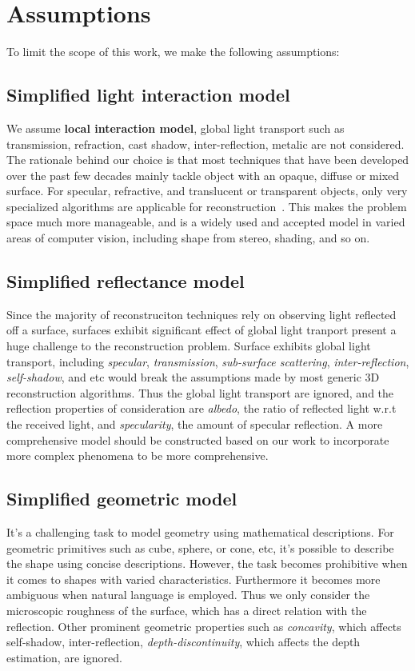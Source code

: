 \section{Assumptions}
To limit the scope of this work, we make the following assumptions:

\subsection{Simplified light interaction model}
We assume \textbf{local interaction model}, \ie global light transport such as transmission, refraction, cast shadow, inter-reflection, metalic are not considered. The rationale behind our choice is that most techniques that have been developed over the past few decades mainly tackle object with an opaque, diffuse or mixed surface. For specular, refractive, and translucent or transparent objects, only very specialized algorithms are applicable for reconstruction~\cite{ihrke2010transparent}. This makes the problem space much more manageable, and is a widely used and accepted model in varied areas of computer vision, including shape from stereo, shading, and so on.

\subsection{Simplified reflectance model}
Since the majority of reconstruciton techniques rely on observing light reflected off a surface, surfaces exhibit significant effect of global light tranport present a huge challenge to the reconstruction problem. Surface exhibits global light transport, including \textit{specular}, \textit{transmission}, \textit{sub-surface scattering}, \textit{inter-reflection}, \textit{self-shadow}, and etc would break the assumptions made by most generic 3D reconstruction algorithms. Thus the global light transport are ignored, and the reflection properties of consideration are \textit{albedo}, \ie the ratio of reflected light w.r.t the received light, and \textit{specularity}, \ie the amount of specular reflection. A more comprehensive model should be constructed based on our work to incorporate more complex phenomena to be more comprehensive.

\subsection{Simplified geometric model}
It's a challenging task to model geometry using mathematical descriptions. For geometric primitives such as cube, sphere, or cone, etc, it's possible to describe the shape using concise descriptions. However, the task becomes prohibitive when it comes to shapes with varied characteristics. Furthermore it becomes more ambiguous when natural language is employed. Thus we only consider the microscopic roughness of the surface, which has a direct relation with the reflection. Other prominent geometric properties such as \textit{concavity}, which affects self-shadow, inter-reflection, \textit{depth-discontinuity}, which affects the depth estimation, are ignored.

